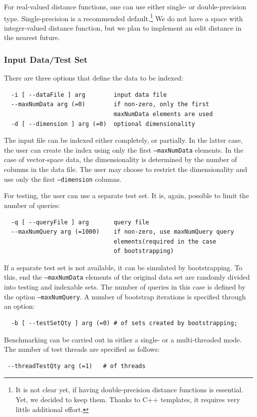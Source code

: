 \documentclass[runningheads,a4paper]{llncs}
\newcommand{\ttt}[1]{\texttt{#1}}
\begin{document}
{For real-valued distance functions, one can use either single- or double-precision
type. Single-precision is a recommended default.\footnote{It is not clear yet,
if having double-precision distance functions is essential. Yet, we decided
to keep them. Thanks to C++ templates, it requires very little additional effort.}
We do not have a space with integer-valued distance function, but we
plan to implement an edit distance in the nearest future.

\subsubsection{Input Data/Test Set}
There are three options that define the data to be indexed:
\begin{verbatim}
  -i [ --dataFile ] arg        input data file
  --maxNumData arg (=0)        if non-zero, only the first 
                               maxNumData elements are used
  -d [ --dimension ] arg (=0)  optional dimensionality
\end{verbatim}
The input file can be indexed either completely, or partially.
In the latter case, the user can create the index using only
the first \ttt{--maxNumData} elements.
In the case of vector-space data, the dimensionality is determined
by the number of columns in the data file.
The user may choose to restrict the dimensionality and use only the first 
\ttt{--dimension} columns.

For testing, the user can use a separate test set.
It is, again, possible to limit the number of queries:
\begin{verbatim}
  -q [ --queryFile ] arg       query file
  --maxNumQuery arg (=1000)    if non-zero, use maxNumQuery query 
                               elements(required in the case 
                               of bootstrapping)
\end{verbatim}
If a separate test set is not available, it can be simulated by bootstrapping.
To this, end the \ttt{--maxNumData} elements of the original data set
are randomly divided into testing and indexable sets.
The number of queries in this case is defined by the option \ttt{--maxNumQuery}.
A number of bootstrap iterations is specified through an option:
\begin{verbatim}
  -b [ --testSetQty ] arg (=0) # of sets created by bootstrapping; 
\end{verbatim}
Benchmarking can be carried out in either a single- or a multi-threaded
mode. The number of test threads are specified as follows:
\begin{verbatim}
 --threadTestQty arg (=1)   # of threads
\end{verbatim}

}
\end{document}
